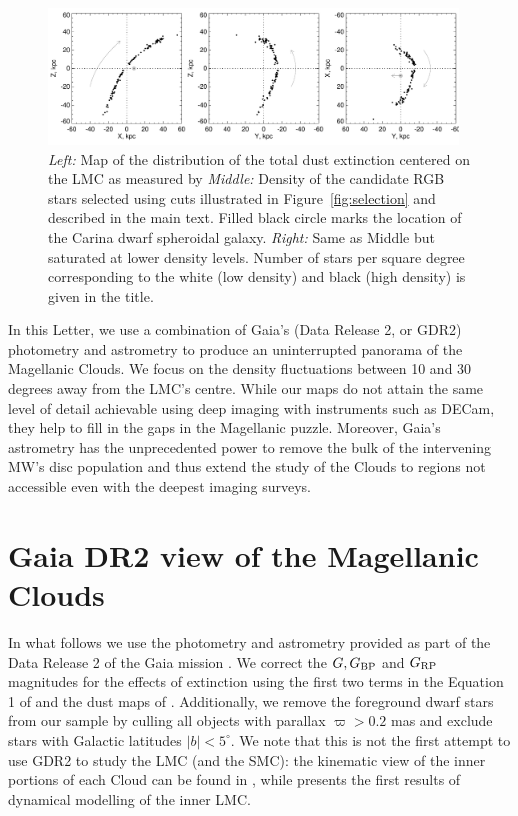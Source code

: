 \documentclass[a4paper,useAMS,usenatbib]{mnras}
\begin{document}
%
\begin{figure}
  \centering
  \includegraphics[width=0.97\textwidth]{orphan_paper_xyz_members.pdf}
  \caption[]{ {\it Left:} Map of the distribution of the total dust
    extinction centered on the LMC as measured by \citet{SFD} {\it
      Middle:} Density of the candidate RGB stars selected using cuts
    illustrated in Figure~\ref{fig:selection} and described in the
    main text. Filled black circle marks the location of the Carina
    dwarf spheroidal galaxy. {\it Right:} Same as Middle but saturated
    at lower density levels. Number of stars per square degree
    corresponding to the white (low density) and black (high density)
    is given in the title.}
   \label{fig:map}
\end{figure}
%

In this Letter, we use a combination of Gaia's (Data Release 2, or
GDR2) photometry and astrometry to produce an uninterrupted panorama
of the Magellanic Clouds. We focus on the density fluctuations between
10 and 30 degrees away from the LMC's centre. While our maps do not
attain the same level of detail achievable using deep imaging with
instruments such as DECam, they help to fill in the gaps in the
Magellanic puzzle. Moreover, Gaia's astrometry has the
unprecedented power to remove the bulk of the intervening MW's
disc population and thus extend the study of the Clouds to regions
not accessible even with the deepest imaging surveys.


\section{Gaia DR2 view of the Magellanic Clouds}

In what follows we use the photometry and astrometry provided as part
of the Data Release 2 \citep[][]{Brown2018} of the Gaia mission
\citep[][]{Prusti2016}. We correct the $G, G_{\rm BP}$ and $G_{\rm
  RP}$ magnitudes for the effects of extinction using the first two
terms in the Equation 1 of \citet{Babusiaux2018} and the dust maps of
\citet{SFD}. Additionally, we remove the foreground dwarf stars from
our sample by culling all objects with parallax $\varpi>0.2$ mas and
exclude stars with Galactic latitudes $|b|<5^{\circ}$. We note that
this is not the first attempt to use GDR2 to study the LMC (and the
SMC): the kinematic view of the inner portions of each Cloud can be
found in \citet{Helmi2018}, while \citet{Vasiliev2018} presents the
first results of dynamical modelling of the inner LMC.
\end{document}
